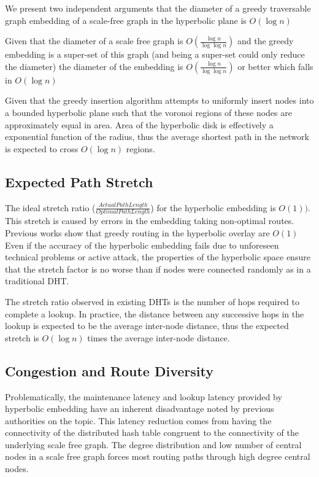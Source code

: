 We present two independent arguments that the diameter of a greedy traversable graph embedding of a scale-free graph in the hyperbolic plane is $O(\log{n})$

Given that the diameter of a scale free graph is $O(\frac{\log{n}}{\log{\log{n}}})$\cite{bollobas2004diameter} and the greedy embedding is a super-set of this graph (and being a super-set could only reduce the diameter) the diameter of the embedding is $O(\frac{\log{n}}{\log{\log{n}}})$ or better which falls in $O(\log{n})$

Given that the greedy insertion algorithm attempts to uniformly insert nodes into a bounded hyperbolic plane such that the voronoi regions of these nodes are approximately equal in area.
Area of the hyperbolic disk is effectively a exponential function of the radius, thus the average shortest path in the network is expected to cross $O(\log{n})$ regions.

\subsection{Expected Path Stretch}

The ideal stretch ratio ($\frac{\mathit{Actual Path Length}}{\mathit{Optimal Path Length}}$) for the hyperbolic embedding is $O(1))$.
This stretch is caused by errors in the embedding taking non-optimal routes.
Previous works show that greedy routing in the hyperbolic overlay are $O(1)$
Even if the accuracy of the hyperbolic embedding fails due to unforeseen technical problems or active attack, the properties of the hyperbolic space ensure that the stretch factor is no worse than if nodes were connected randomly as in a traditional DHT.

The stretch ratio observed in existing DHTs is the number of hops required to complete a lookup.
In practice, the distance between any successive hops in the lookup is expected to be the average inter-node distance, thus the expected stretch is $O(\log{n})$ times the average inter-node distance. 


\subsection{Congestion and Route Diversity}
Problematically, the maintenance latency and lookup latency provided by hyperbolic embedding have an inherent disadvantage noted by previous authorities on the topic\cite{kleinberg2007geographic}. 
This latency reduction comes from having the connectivity of the distributed hash table congruent to the connectivity of the underlying scale free graph.
The degree distribution and low number of central nodes in a scale free graph forces most routing paths through high degree central nodes.

